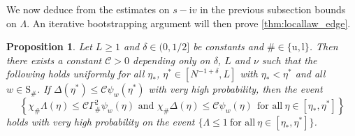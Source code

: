 \documentclass[11pt]{article}
\newcommand{\ii}{\mathrm{i}}
\theoremstyle{plain}
\newtheorem{prop}{Proposition}[section]
\theoremstyle{remark}
\numberwithin{equation}{section}
\begin{document}
	We now deduce from the estimates on $s-\ii v$ in the previous subsection bounds on $\Lambda$. 
	An iterative bootstrapping argument will then prove \cref{thm:locallaw_edge}. 

	\begin{prop}\label{prop:phi_Lambda_small2}
		Let $L \geq 1$ and $\delta \in (0,1/2]$ be constants and $\# \in \{\mathrm{u},\mathrm{l}\}$. Then there exists a constant $\mathcal C >0$ depending only on $\delta$, $L$ and $\nu$ such that the following holds uniformly for all $\eta_*$, $\eta^* \in [N^{-1+\delta},L]$ with $\eta_* < \eta^*$ and all $w \in \mathrm{S}_\#$. If $\Delta(\eta^*) \leq \mathcal C  \psi_w(\eta^*)$ with very high probability, then the event 
		\begin{equation*}
			\left\{ \chi_\# \Lambda (\eta)\le \mathcal{C}\Gamma_\#^2 \psi_w(\eta) \text{ and } \chi_\# \Delta(\eta) \leq \mathcal C \psi_w(\eta) ~~\text{for all}~ \eta \in [ \eta_{\ast}, \eta^{\ast}] \right\}
		\end{equation*}
		holds with very high probability on the event $\{ \Lambda \leq 1 ~\text{for all} ~ \eta \in [\eta_{\ast}, \eta^{\ast}]\}$. 
	\end{prop}
\end{document}
